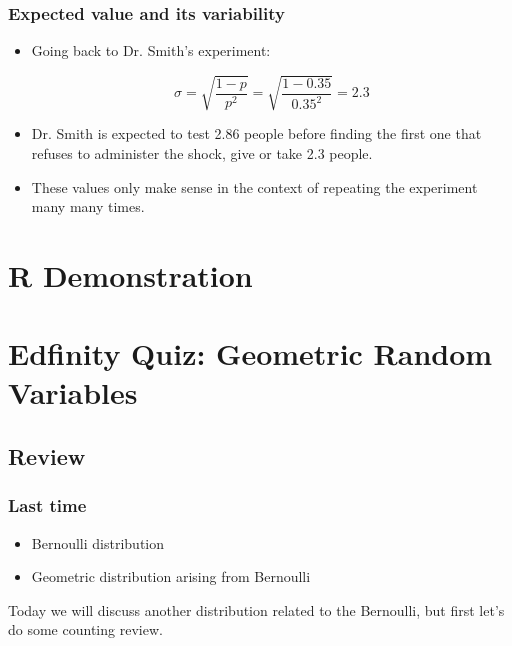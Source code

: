 \documentclass[slidestop,compress,mathserif]{beamer}
\begin{document}
\begin{frame}
\frametitle{Expected value and its variability}


\pause

\begin{itemize}

\item Going back to Dr. Smith's experiment:

\[ \sigma = \sqrt{\frac{1-p}{p^2}} = \sqrt{\frac{1-0.35}{0.35^2}} = 2.3 \]

\pause

\item Dr. Smith is expected to test 2.86 people before finding the first one that refuses to administer the shock, give or take 2.3 people.

\pause

\item These values only make sense in the context of repeating the experiment many many times.

\end{itemize}

\end{frame}


\section{R Demonstration}


\section{Edfinity Quiz: Geometric Random Variables}


\subsection{Review}

\begin{frame}
\frametitle{Last time}

\begin{itemize}
    \item Bernoulli distribution
    \item Geometric distribution arising from Bernoulli
\end{itemize}

Today we will discuss another distribution related to the Bernoulli, but first let's do some counting review.
\end{frame}
\end{document}
